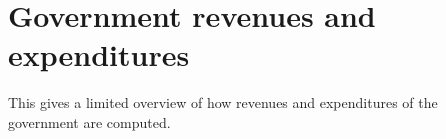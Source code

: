 \section{Government revenues and expenditures}
This gives a limited overview of how revenues and expenditures of the 
government are computed. 



%
%
%

%

